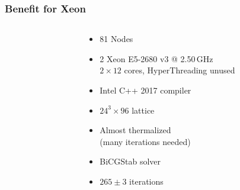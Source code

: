 \documentclass{beamer}
\begin{document}
  \begin{frame}
    \frametitle{Benefit for Xeon}

    \begin{columns}
      \begin{column}{0.5\linewidth}

%
%
          
      \end{column}

      \begin{column}{0.5\linewidth}
        \begin{itemize}
          \item 81 Nodes
          \item 2 Xeon E5-2680 v3 @ 2.50\,GHz \\ $2×12$ cores, HyperThreading unused
          \item Intel C++ 2017 compiler
          \item $24^3 \times 96$ lattice
          \item Almost thermalized \\ (many iterations needed)
          \item BiCGStab solver
          \item $265 \pm 3$ iterations
        \end{itemize}
      \end{column}
    \end{columns}


  \end{frame}
\end{document}
